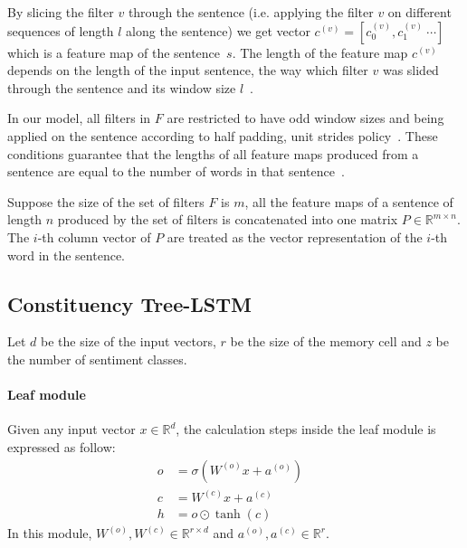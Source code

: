 By slicing the filter \(v\) through the sentence (i.e. applying the filter \(v\) on different sequences of length \(l\) along the sentence) we get vector \(c^{(v)} = [c^{(v)}_0, c^{(v)}_1~\cdots]\) which is a feature map of the sentence~\(s\).
The length of the feature map \(c^{(v)}\) depends on the length of the input sentence, the way which filter \(v\) was slided through the sentence and its window size \(l\)~\cite{conv-arith}.

In our model, all filters in \(F\) are restricted to have odd window sizes and being applied on the sentence according to half padding, unit strides policy~\cite{conv-arith}.
These conditions guarantee that the lengths of all feature maps produced from a sentence are equal to the number of words in that sentence~\cite{conv-arith}.

Suppose the size of the set of filters \(F\) is \(m\), all the feature maps of a sentence of length \(n\) produced by the set of filters is concatenated into one matrix \(P \in \mathbb{R}^{m \times n}\).
The \(i\)-th column vector of \(P\) are treated as the vector representation of the \(i\)-th word in the sentence.
\subsection{Constituency Tree-LSTM}\label{treelstm}
Let \(d\) be the size of the input vectors, \(r
\) be the size of the memory cell and \(z\) be the number of sentiment classes.
\paragraph{Leaf module}
Given any input vector \(x \in \mathbb{R}^d\), the calculation steps inside the leaf module is expressed as follow:
\begin{align}
o &= \sigma{\left( W^{(o)} x + a^{\left(o\right)}\right)} & \\
c &= W^{(c)} x + a^{(c)} & \\
h &= o \odot \tanh{\left(c\right)} &
\end{align}
In this module, \(W^{(o)}, W^{(c)} \in \mathbb{R}^{r \times d}\) and \(a^{\left(o\right)}, a^{(c)} \in \mathbb{R}^r\).

